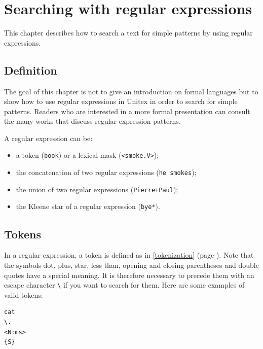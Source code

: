 \chapter{Searching with regular expressions}
\label{chap-regexp}

This chapter describes how to search a text for simple patterns by using regular
expressions.

\section{Definition}

The goal of this chapter is not to give an introduction on formal languages but
to show how to use regular expressions in Unitex in order to search for simple
patterns. Readers who are interested in a more formal presentation can consult
the many works that discuss regular expression patterns.

\bigskip \noindent A regular expression can be:

\begin{itemize}
  \item a token (\verb+book+) or a lexical mask
  (\verb+<smoke.V>+);
  \item the concatenation of two regular
  expressions (\verb+he smokes+);
  \item the union of two regular expressions (\verb$Pierre+Paul$); 
  \item the Kleene star of a regular expression
  (\verb+bye*+).
\end{itemize}





\section{Tokens}

In a regular expression, a token is defined as in \ref{tokenization} (page
\pageref{tokenization}). Note that the symbols dot, plus,
star, less than, opening and closing parentheses and double quotes have a
special meaning. It is therefore necessary to precede them with an escape character
\verb+\+ if you want to search for them. Here are some examples of valid
tokens: \index{\verb+\+}

\begin{verbatim}
cat
\.
<N:ms>
{S}
\end{verbatim}

